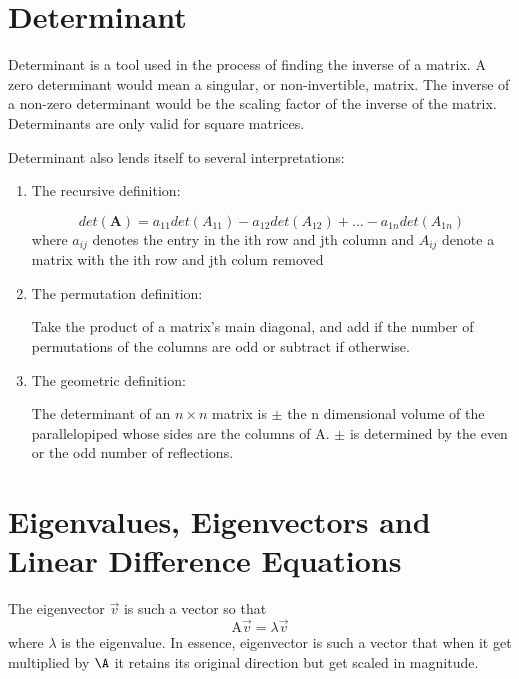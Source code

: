 \documentclass[11pt]{article}
\begin{document}
\section{Determinant}
Determinant is a tool used in the process of finding the inverse of a matrix. A zero determinant would mean a singular, or non-invertible, matrix. The inverse of a non-zero determinant would be the scaling factor of the inverse of the matrix. Determinants are only valid for square matrices.

Determinant also lends itself to several interpretations:\\
\begin{enumerate}
   \item The recursive definition:
   \begin{itemize}
    \begin{equation}
    det(\textbf{A}) = a_{11}det(A_{11}) - a_{12}det(A_{12}) + \dots - a_{1n}det(A_{1n})
    \end{equation}
    where $a_{ij}$ denotes the entry in the ith row and jth column and $A_{ij}$ denote a matrix with the ith row and jth colum removed
   \end{itemize}
   \item The permutation definition:
   \begin{itemize}
       Take the product of a matrix's main diagonal, and add if the number of permutations of the columns are odd or subtract if otherwise.
   \end{itemize}
   \item The geometric definition:
   \begin{itemize}
       The determinant of an $n \times n$ matrix is $\pm$ the n dimensional volume of the parallelopiped whose sides are the columns of A. $\pm$ is determined by the even or the odd number of reflections.
    \end{itemize}
\end{enumerate}

\section{Eigenvalues, Eigenvectors and Linear Difference Equations}
The eigenvector $\vec{v}$ is such a vector so that
\begin{equation}
    \text{A}\vec{v} = \lambda\vec{v}
\end{equation}
where $\lambda$ is the eigenvalue. In essence, eigenvector is such a vector that when it get multiplied by $\A$ it retains its original direction but get scaled in magnitude.
\end{document}

